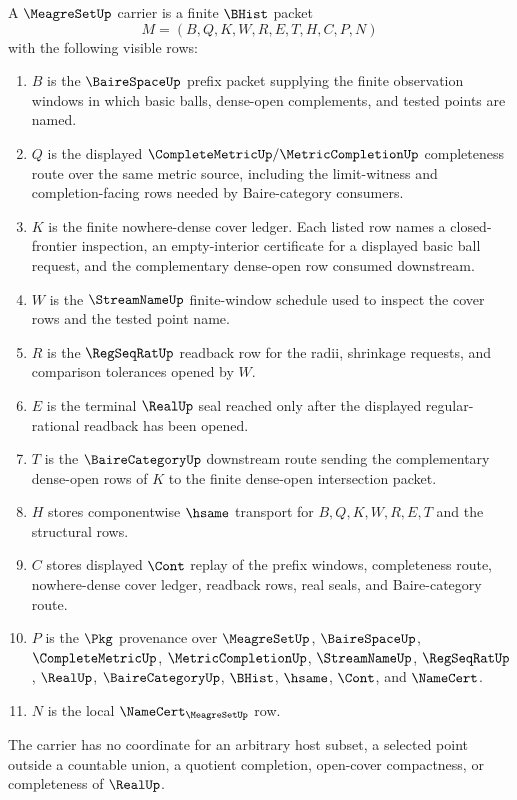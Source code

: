 \begin{definition}\label{def:meagre-set-carrier}
A $\MeagreSetUp$ carrier is a finite $\BHist$ packet
$$
M=(B,Q,K,W,R,E,T,H,C,P,N)
$$
with the following visible rows:
\begin{enumerate}
\item $B$ is the $\BaireSpaceUp$ prefix packet supplying the finite observation windows in which basic balls, dense-open complements, and tested points are named.
\item $Q$ is the displayed $\CompleteMetricUp/\MetricCompletionUp$ completeness route over the same metric source, including the limit-witness and completion-facing rows needed by Baire-category consumers.
\item $K$ is the finite nowhere-dense cover ledger. Each listed row names a closed-frontier inspection, an empty-interior certificate for a displayed basic ball request, and the complementary dense-open row consumed downstream.
\item $W$ is the $\StreamNameUp$ finite-window schedule used to inspect the cover rows and the tested point name.
\item $R$ is the $\RegSeqRatUp$ readback row for the radii, shrinkage requests, and comparison tolerances opened by $W$.
\item $E$ is the terminal $\RealUp$ seal reached only after the displayed regular-rational readback has been opened.
\item $T$ is the $\BaireCategoryUp$ downstream route sending the complementary dense-open rows of $K$ to the finite dense-open intersection packet.
\item $H$ stores componentwise $\hsame$ transport for $B,Q,K,W,R,E,T$ and the structural rows.
\item $C$ stores displayed $\Cont$ replay of the prefix windows, completeness route, nowhere-dense cover ledger, readback rows, real seals, and Baire-category route.
\item $P$ is the $\Pkg$ provenance over $\MeagreSetUp$, $\BaireSpaceUp$, $\CompleteMetricUp$, $\MetricCompletionUp$, $\StreamNameUp$, $\RegSeqRatUp$, $\RealUp$, $\BaireCategoryUp$, $\BHist$, $\hsame$, $\Cont$, and $\NameCert$.
\item $N$ is the local $\NameCert_{\MeagreSetUp}$ row.
\end{enumerate}
The carrier has no coordinate for an arbitrary host subset, a selected point outside a countable union, a quotient completion, open-cover compactness, or completeness of $\RealUp$.
\end{definition}


